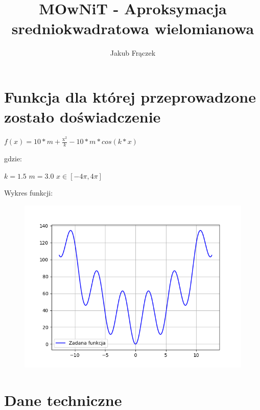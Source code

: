 \documentclass{article}
\title{MOwNiT - Aproksymacja sredniokwadratowa wielomianowa}
\author{Jakub Frączek}
\begin{document}
\maketitle

\section{Funkcja dla której przeprowadzone zostało doświadczenie}

\begin{center}
\(f(x) = 10 * m + \frac{\mathrm{x}_{}^{2}}{k} - 10 * m * cos(k*x)\)
\end{center}

\noindent
gdzie:

\bigbreak

\(k = 1.5\)
\newline \indent
\(m = 3.0\)
\newline \indent
\(x \in [-4\pi, 4\pi]\)

\bigbreak

\noindent
Wykres funkcji:

\begin{figure}[H]
  \centering
  \begin{minipage}[b]{0.5\textwidth}
    \includegraphics[width=\textwidth]{zadana_funkcja.png}
  \end{minipage}
\end{figure}

\section{Dane techniczne}
\end{document}
